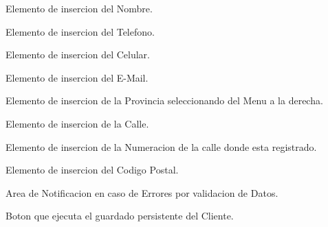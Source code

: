 \documentclass[
10pt, %
a4paper, %
oneside, %
headinclude,footinclude, %
BCOR5mm, %
]{scrartcl}
\begin{document}
 \begin{enumerated}
   \item  Elemento de insercion del Nombre.
   \item  Elemento de insercion del Telefono.
   \item  Elemento de insercion del Celular.
   \item  Elemento de insercion del E-Mail.
   \item  Elemento de insercion de la Provincia seleccionando
      del Menu a la derecha.
   \item  Elemento de insercion de la Calle.
   \item  Elemento de insercion de la Numeracion de la calle donde esta registrado.
   \item  Elemento de insercion del Codigo Postal.
   \item  Area de Notificacion en caso de Errores por validacion de Datos.
   \item  Boton que ejecuta el guardado persistente del Cliente.
  \end{enumerated}
\end{document}
